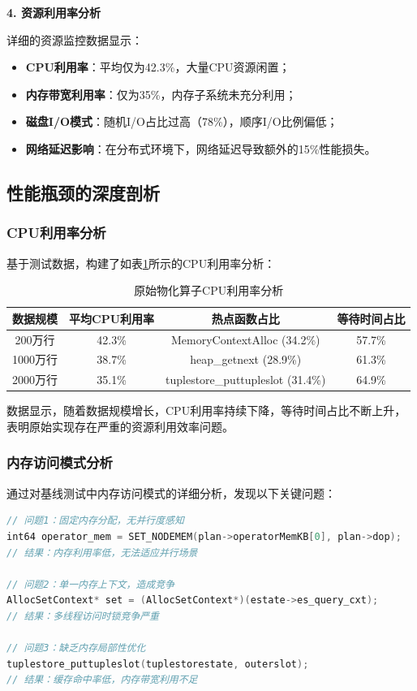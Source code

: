 \textbf{4. 资源利用率分析}

详细的资源监控数据显示：

\begin{itemize}
    \item \textbf{CPU利用率}：平均仅为42.3\%，大量CPU资源闲置；
    \item \textbf{内存带宽利用率}：仅为35\%，内存子系统未充分利用；
    \item \textbf{磁盘I/O模式}：随机I/O占比过高（78\%），顺序I/O比例偏低；
    \item \textbf{网络延迟影响}：在分布式环境下，网络延迟导致额外的15\%性能损失。
\end{itemize}

\subsection{性能瓶颈的深度剖析}

\subsubsection{CPU利用率分析}

基于测试数据，构建了如表\ref{tab:cpu_analysis}所示的CPU利用率分析：

\begin{table}[htbp]
\centering
\caption{原始物化算子CPU利用率分析}
\label{tab:cpu_analysis}
\begin{tabular}{|c|c|c|c|}
\hline
数据规模 & 平均CPU利用率 & 热点函数占比 & 等待时间占比 \\
\hline
200万行 & 42.3\% & MemoryContextAlloc (34.2\%) & 57.7\% \\
1000万行 & 38.7\% & heap\_getnext (28.9\%) & 61.3\% \\
2000万行 & 35.1\% & tuplestore\_puttupleslot (31.4\%) & 64.9\% \\
\hline
\end{tabular}
\end{table}

数据显示，随着数据规模增长，CPU利用率持续下降，等待时间占比不断上升，表明原始实现存在严重的资源利用效率问题。

\subsubsection{内存访问模式分析}

通过对基线测试中内存访问模式的详细分析，发现以下关键问题：

\begin{lstlisting}[language=C, caption=原始内存分配模式问题示例]
// 问题1：固定内存分配，无并行度感知
int64 operator_mem = SET_NODEMEM(plan->operatorMemKB[0], plan->dop);
// 结果：内存利用率低，无法适应并行场景

// 问题2：单一内存上下文，造成竞争
AllocSetContext* set = (AllocSetContext*)(estate->es_query_cxt);
// 结果：多线程访问时锁竞争严重

// 问题3：缺乏内存局部性优化
tuplestore_puttupleslot(tuplestorestate, outerslot);
// 结果：缓存命中率低，内存带宽利用不足
\end{lstlisting}

